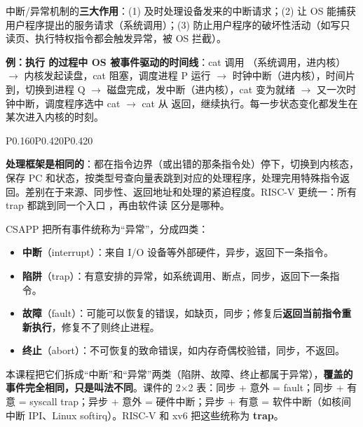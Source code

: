 中断/异常机制的\textbf{三大作用}：(1) 及时处理设备发来的中断请求；(2) 让 OS 能捕获用户程序提出的服务请求（系统调用）；(3) 防止用户程序的破坏性活动（如写只读页、执行特权指令都会触发异常，被 OS 拦截）。

\textbf{例：执行  的过程中 OS 被事件驱动的时间线}：cat 调用 （系统调用，进内核）$\to$ 内核发起读盘，cat 阻塞，调度进程 P 运行 $\to$ 时钟中断（进内核），时间片到，切换到进程 Q $\to$ 磁盘完成，发中断（进内核），cat 变为就绪 $\to$ 又一次时钟中断，调度程序选中 cat $\to$ cat 从  返回，继续执行。每一步状态变化都发生在某次进入内核的时刻。

\begin{btab}{P{0.160}P{0.420}P{0.420}}
\end{btab}
\textbf{处理框架是相同的}：都在指令边界（或出错的那条指令处）停下，切换到内核态，保存 PC 和状态，按类型号查向量表跳到对应的处理程序，处理完用特殊指令返回。差别在于来源、同步性、返回地址和处理的紧迫程度。RISC-V 更统一：所有 trap 都跳到同一个入口 ，再由软件读  区分是哪种。

CSAPP 把所有事件统称为“异常”，分成四类：
\begin{itemize}
    \item \textbf{中断}（interrupt）：来自 I/O 设备等外部硬件，异步，返回下一条指令。
    \item \textbf{陷阱}（trap）：有意安排的异常，如系统调用、断点，同步，返回下一条指令。
    \item \textbf{故障}（fault）：可能可以恢复的错误，如缺页，同步；修复后\textbf{返回当前指令重新执行}，修复不了则终止进程。
    \item \textbf{终止}（abort）：不可恢复的致命错误，如内存奇偶校验错，同步，不返回。
\end{itemize}
本课程把它们拆成“中断”和“异常”两类（陷阱、故障、终止都属于异常），\textbf{覆盖的事件完全相同，只是叫法不同}。课件的 2$\times$2 表：同步 + 意外 = fault；同步 + 有意 = syscall trap；异步 + 意外 = 硬件中断；异步 + 有意 = 软件中断（如核间中断 IPI、Linux softirq）。RISC-V 和 xv6 把这些统称为 \textbf{trap}。

